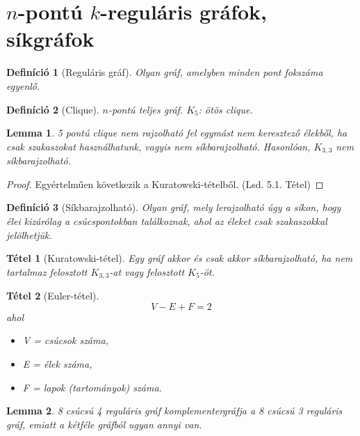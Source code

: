 \documentclass{article}
\newtheorem{definition}{Definíció}[section]
\newtheorem{lemma}{Lemma}[section]
\newtheorem{theorem}{Tétel}[section]
\begin{document}
\section{$n$-pontú $k$-reguláris gráfok, síkgráfok}
\begin{definition}[Reguláris gráf]
    Olyan gráf, amelyben minden pont fokszáma egyenlő.
\end{definition}

\begin{definition}[Clique]
    $n$-pontú teljes gráf. $K_5$: ötös clique.
\end{definition}

\begin{lemma}
    5 pontú clique nem rajzolható fel egymást nem keresztező élekből, ha csak szakaszokat használhatunk, vagyis nem síkbarajzolható. Hasonlóan, $K_{3,3}$ nem síkbarajzolható.
\end{lemma}
\begin{proof}
    Egyértelműen következik a Kuratowski-tételből. (Lsd. 5.1. Tétel)
\end{proof}

\begin{definition}[Síkbarajzolható]
    Olyan gráf, mely lerajzolható úgy a síkon, hogy élei kizárólag a csúcspontokban találkoznak, ahol az éleket csak szakaszokkal jelölhetjük.
\end{definition}

\begin{theorem}[Kuratowski-tétel]
    Egy gráf akkor és csak akkor síkbarajzolható, ha nem tartalmaz felosztott $K_{3,3}$-at vagy felosztott $K_5$-öt.
\end{theorem}

\begin{theorem}[Euler-tétel]
    \[
    V - E + F = 2
    \]
    ahol
    \begin{itemize}
        \item V = csúcsok száma,
        \item E = élek száma,
        \item F = lapok (tartományok) száma.
    \end{itemize}
\end{theorem}

\begin{lemma}
    8 csúcsú 4 reguláris gráf komplementergráfja a 8 csúcsú 3 reguláris gráf, emiatt a kétféle gráfból ugyan annyi van.
\end{lemma}
\end{document}
